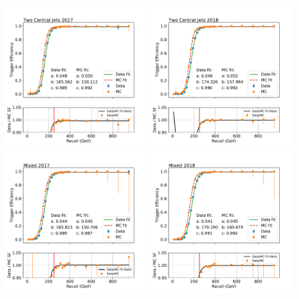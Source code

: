 \begin{figure}[ht!]
    \centering
    \includegraphics[width=0.49\textwidth]{Efficiency/METTrigger/eff_fit_two_central_jets_2017.pdf}
    \includegraphics[width=0.49\textwidth]{Efficiency/METTrigger/eff_fit_two_central_jets_2018.pdf}
    \includegraphics[width=0.49\textwidth]{Efficiency/METTrigger/eff_fit_one_jet_forward_one_jet_central_2017.pdf}
    \includegraphics[width=0.49\textwidth]{Efficiency/METTrigger/eff_fit_one_jet_forward_one_jet_central_2018.pdf}

\end{figure}
